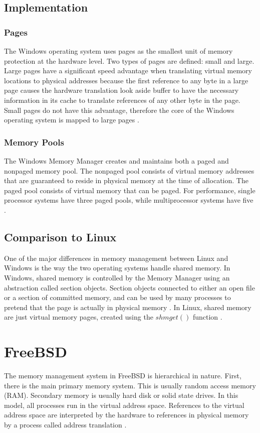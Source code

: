 \documentclass[letterpaper,draftclsnofoot,10pt,onecolumn,titlepage]{IEEEtran}\usepackage[margin=0.75in]{geometry}
\begin{document}
\subsection{Implementation}

\subsubsection{Pages}
The Windows operating system uses pages as the smallest unit of memory protection at the hardware level.
Two types of pages are defined: small and large. Large pages have a significant speed advantage when 
translating virtual memory locations to physical addresses because the first reference to any byte in a 
large page causes the hardware translation look aside buffer to have the necessary information in its 
cache to translate references of any other byte in the page. Small pages do not have this advantage,
therefore the core of the Windows operating system is mapped to large pages \cite{windows}.

\subsubsection{Memory Pools}
The Windows Memory Manager creates and maintains both a paged and nonpaged memory pool. The nonpaged 
pool consists of virtual memory addresses that are guaranteed to reside in physical memory at the 
time of allocation. The paged pool consists of virtual memory that can be paged. For performance,
single processor systems have three paged pools, while multiprocessor systems have five \cite{windows}.

\subsection{Comparison to Linux}
One of the major differences in memory management between Linux and Windows is the way the two 
operating systems handle shared memory. In Windows, shared memory is controlled by the Memory Manager
using an abstraction called section objects. Section objects connected to either an open file or a 
section of committed memory, and can be used by many processes to pretend that the page is actually
in physical memory \cite{windows}. In Linux, shared memory are just virtual memory pages, created 
using the $shmget()$ function \cite{linux}.


\section{FreeBSD}
The memory management system in FreeBSD is hierarchical in nature. First, there is the main primary memory system.
This is usually random access memory (RAM). Secondary memory is usually hard disk or solid state drives. In 
this model, all processes run in the virtual address space. References to the virtual address space are 
interpreted by the hardware to references in physical memory by a process called address translation \cite{freebsd}.
\end{document}
